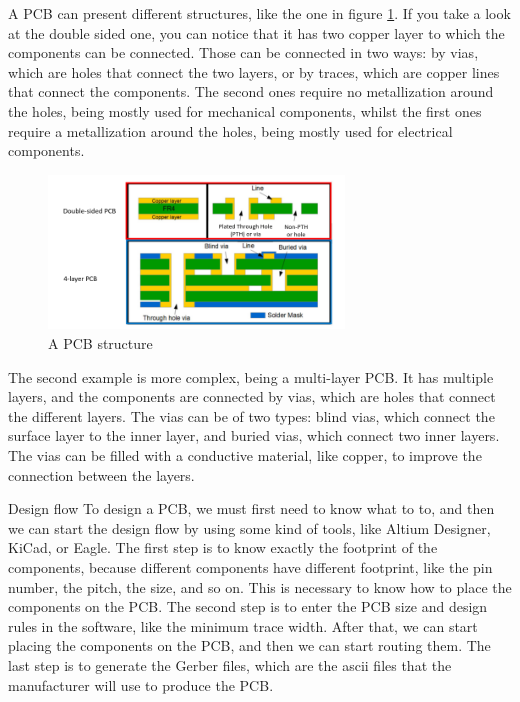 A PCB can present different structures, like the one in figure \ref{fig:pcb-structure}. If you take
a look at the double sided one, you can notice that it has two copper layer to which the components
can be connected. Those can be connected in two ways: by vias, which are holes that connect the two
layers, or by traces, which are copper lines that connect the components. The second ones require no
metallization around the holes, being mostly used for mechanical components, whilst the first ones
require a metallization around the holes, being mostly used for electrical components.
\begin{figure}[h]
  \centering
  \includegraphics[width=0.7\textwidth]{img/hardware/pcb structure.png}
  \caption{A PCB structure}
  \label{fig:pcb-structure}
\end{figure}
The second example is more complex, being a multi-layer PCB. It has multiple layers, and the
components are connected by vias, which are holes that connect the different layers. The vias can
be of two types: blind vias, which connect the surface layer to the inner layer, and buried vias,
which connect two inner layers. The vias can be filled with a conductive material, like copper, to
improve the connection between the layers.

\begin{section}{Design flow}
  To design a PCB, we must first need to know what to to, and then we can start the design flow by
  using some kind of tools, like Altium Designer, KiCad, or Eagle. The first step is to know exactly
  the footprint of the components, because different components have different footprint, like the
  pin number, the pitch, the size, and so on. This is necessary to know how to place the components
  on the PCB. The second step is to enter the PCB size and design rules in the software, like the 
  minimum trace width. After that, we can start placing the components on the PCB, and then we can 
  start routing them. The last step is to generate the Gerber files, which are the ascii files that
  the manufacturer will use to produce the PCB.
\end{section}

